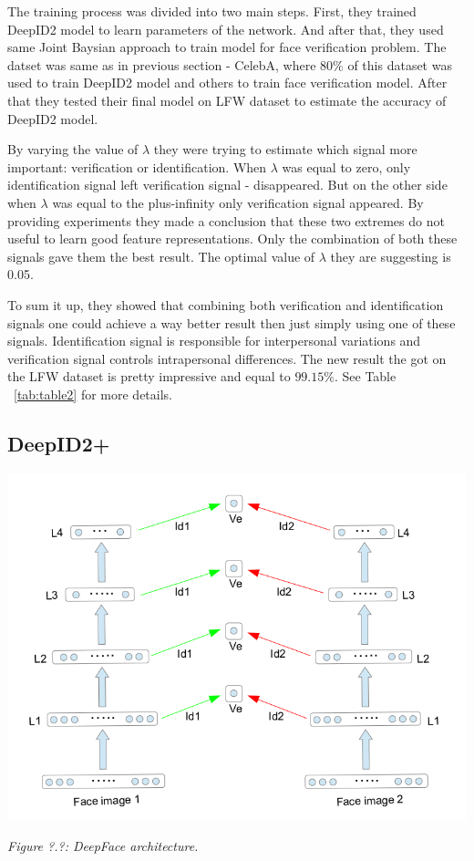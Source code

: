 \documentclass[paper=a4, fontsize=11pt]{scrartcl} %
\numberwithin{equation}{section} %
\numberwithin{figure}{section} %
\numberwithin{table}{section} %
\begin{document}
The training process was divided into two main steps. First, they trained DeepID2 model to learn parameters of the network. And after that, they used same Joint Baysian approach to train model for face verification problem. The datset was same as in previous section - CelebA, where $80\%$ of this dataset was used to train DeepID2 model and others to train face verification model. After that they tested their final model on LFW dataset to estimate the accuracy of DeepID2 model. \par

By varying the value of $\lambda$ they were trying to estimate which signal more important: verification or identification. When $\lambda$ was equal to zero, only identification signal left verification signal - disappeared. But on the other side when $\lambda$ was equal to the plus-infinity only verification signal appeared. By providing experiments they made a conclusion that these two extremes do not useful to learn good feature representations. Only the combination of both these signals gave them the best result. The optimal value of $\lambda$ they are suggesting is 0.05. \par

To sum it up, they showed that combining both verification and identification signals one could achieve a way better result then just simply using one of these signals. Identification signal is responsible for interpersonal variations and verification signal controls intrapersonal differences. The new result the got on the LFW dataset is pretty impressive and equal to $99.15\%$. See Table ~\ref{tab:table2} for more details.



\subsection{DeepID2+}

\begin{center}
\includegraphics[scale=0.5]{pictures/deepid3.png}
\par\large\textit{Figure ?.?: DeepFace architecture.}
\end{center}
\end{document}
